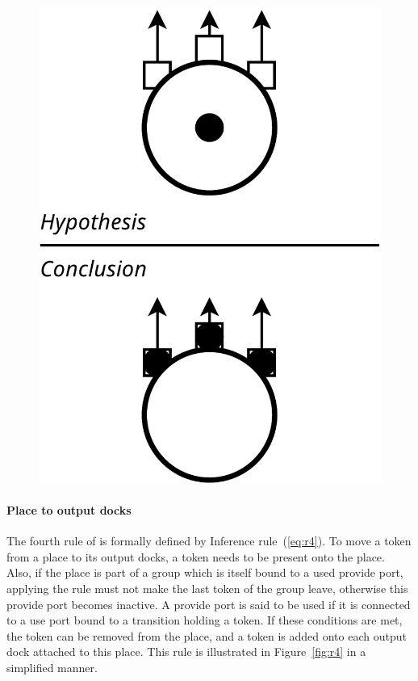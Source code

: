 {\begin{figure}[t]
\begin{minipage}[h]{0.45\columnwidth}
  \includegraphics[width=0.65\columnwidth]{./images/place_to_outputdocks.pdf}
\end{minipage}
\end{figure}

\paragraph{Place to output docks}{

The fourth rule of \mad is formally defined by
Inference rule~(\ref{eq:r4}). To move a token from a place to its output
docks, a token needs to be present onto the place. Also, if the place
is part of a group which is itself bound to a used provide port,
applying the rule must not make the last token of the group leave,
otherwise this provide port becomes inactive. A provide port is said
to be used if it is connected to a use port bound to a transition
holding a token.  If these conditions are met, the token can be
removed from the place, and a token is added onto each output dock
attached to this place. This rule is illustrated in
Figure~\ref{fig:r4} in a simplified manner.

}

}
